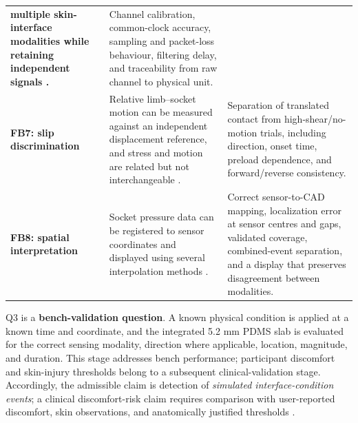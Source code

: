 \begin{tabularx}{\linewidth}{>{\raggedright\arraybackslash\bfseries\color{AUBRed}}p{2.5cm}
                            >{\raggedright\arraybackslash}p{6.15cm}Y}
multiple skin-interface modalities while retaining independent signals
\cite{q3tang2022,q3kwak2020}. & Channel calibration, common-clock accuracy,
sampling and packet-loss behaviour, filtering delay, and traceability from raw
channel to physical unit. \\
FB7: slip discrimination & Relative limb--socket motion can be measured against
an independent displacement reference, and stress and motion are related but
not interchangeable \cite{noll2018,q3tang2022}. & Separation of translated
contact from high-shear/no-motion trials, including direction, onset time,
preload dependence, and forward/reverse consistency. \\
FB8: spatial interpretation & Socket pressure data can be registered to sensor
coordinates and displayed using several interpolation methods
\cite{q3turner2021}. & Correct sensor-to-CAD mapping, localization error at
sensor centres and gaps, validated coverage, combined-event separation, and a
display that preserves disagreement between modalities. \\
\end{tabularx}
\endgroup


\vspace{0.55em}

\clearpage
{}

{\fontsize{9.55}{11.3}\selectfont
Q3 is a \textbf{bench-validation question}. A known physical condition is
applied at a known time and coordinate, and the integrated 5.2 mm PDMS slab is
evaluated for the correct sensing modality, direction where applicable,
location, magnitude, and duration. This stage addresses bench performance;
participant discomfort and skin-injury thresholds belong to a subsequent
clinical-validation stage. Accordingly, the admissible claim is detection of
\emph{simulated interface-condition events}; a clinical discomfort-risk claim
requires comparison with user-reported discomfort, skin observations, and
anatomically justified thresholds \cite{q3armitage2026}.\par}

